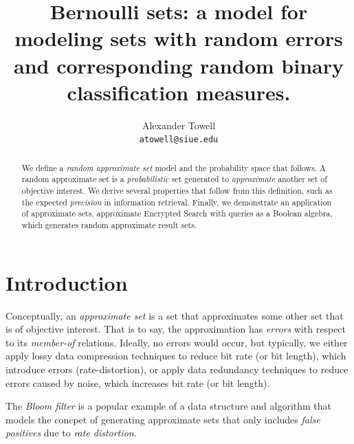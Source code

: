 \documentclass[10pt,final,hidelinks]{article}
\title
{
    Bernoulli sets: a model for modeling sets with random errors\\
    \large and corresponding random binary classification measures.
}
\author
{
    Alexander Towell\\
    \texttt{atowell@siue.edu}
}
\date{}
\numberwithin{equation}{section}
\begin{document}
\maketitle
\begin{abstract}
We define a \emph{random approximate set} model and the probability space that 
follows.
A random approximate set is a \emph{probabilistic} set generated to \emph{approximate} another set of objective interest.
We derive several properties that follow from this definition, such as the expected \emph{precision} in information retrieval.
Finally, we demonstrate an application of approximate sets, approximate Encrypted Search with queries as a Boolean algebra, which generates random approximate result sets.
\end{abstract}

\tableofcontents

%

\providecommand{\mainx}{..}
\section{Introduction}



Conceptually, an \emph{approximate set} is a set that approximates some other set that is of objective interest.
That is to say, the approximation has \emph{errors} with respect to its \emph{member-of} relations.
Ideally, no errors would occur, but typically, we either apply lossy data compression techniques to reduce bit rate (or bit length), which introduce errors (rate-distortion), or apply data redundancy techniques to reduce errors caused by noise, which increases bit rate (or bit length).

The \emph{Bloom filter} is a popular example of a data structure and algorithm that models the concpet of generating approximate sets that only includes \emph{false positives} due to \emph{rate distortion}.
\end{document}
